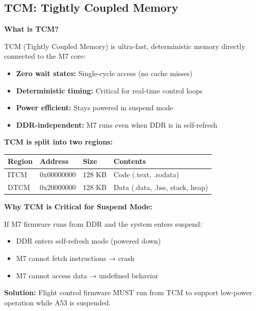 \documentclass[12pt,a4paper]{report}
\begin{document}

\subsection{TCM: Tightly Coupled Memory}

\textbf{What is TCM?}

TCM (Tightly Coupled Memory) is ultra-fast, deterministic memory directly connected to the M7 core:
\begin{itemize}
    \item \textbf{Zero wait states:} Single-cycle access (no cache misses)
    \item \textbf{Deterministic timing:} Critical for real-time control loops
    \item \textbf{Power efficient:} Stays powered in suspend mode
    \item \textbf{DDR-independent:} M7 runs even when DDR is in self-refresh
\end{itemize}

\textbf{TCM is split into two regions:}

\begin{center}
\begin{tabular}{|l|l|l|l|}
\hline
\textbf{Region} & \textbf{Address} & \textbf{Size} & \textbf{Contents} \\
\hline
ITCM & 0x00000000 & 128 KB & Code (.text, .rodata) \\
\hline
DTCM & 0x20000000 & 128 KB & Data (.data, .bss, stack, heap) \\
\hline
\end{tabular}
\end{center}

\begin{important}
\textbf{Why TCM is Critical for Suspend Mode:}

If M7 firmware runs from DDR and the system enters suspend:
\begin{itemize}
    \item DDR enters self-refresh mode (powered down)
    \item M7 cannot fetch instructions → crash
    \item M7 cannot access data → undefined behavior
\end{itemize}

\textbf{Solution:} Flight control firmware MUST run from TCM to support low-power operation while A53 is suspended.
\end{important}
\end{document}
